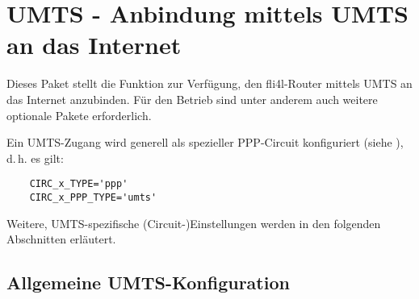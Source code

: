 {
\section {UMTS - Anbindung mittels UMTS an das Internet}
}

Dieses Paket stellt die Funktion zur Verfügung, den fli4l-Router mittels UMTS
an das Internet anzubinden. Für den Betrieb sind unter anderem auch weitere
optionale Pakete erforderlich.

Ein UMTS-Zugang wird generell als spezieller PPP-Circuit konfiguriert (siehe
), d.\,h. es gilt:

\begin{example}
\begin{verbatim}
    CIRC_x_TYPE='ppp'
    CIRC_x_PPP_TYPE='umts'
\end{verbatim}
\end{example}

Weitere, UMTS-spezifische (Circuit-)Einstellungen werden in den folgenden
Abschnitten erläutert.

\subsection{Allgemeine UMTS-Konfiguration}

